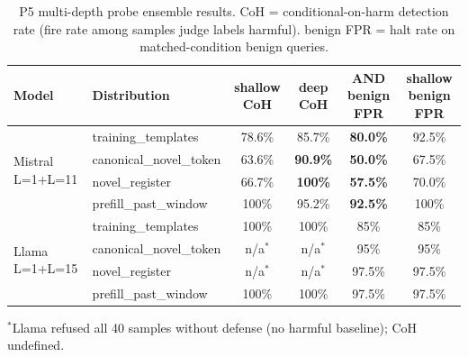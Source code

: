 \documentclass{article}
\begin{document}
\begin{table}[H]
\centering
\small
\caption{P5 multi-depth probe ensemble results. CoH = conditional-on-harm detection rate (fire rate among samples judge labels harmful). benign FPR = halt rate on matched-condition benign queries.}
\label{tab:p5_multidepth}
\begin{tabular}{llcccc}
\toprule
\textbf{Model} & \textbf{Distribution} & \textbf{shallow CoH} & \textbf{deep CoH} & \textbf{AND benign FPR} & \textbf{shallow benign FPR} \\
\midrule
\multirow{4}{*}{Mistral L=1+L=11}
 & training\_templates    & 78.6\%  & 85.7\%        & \textbf{80.0\%} & 92.5\% \\
 & canonical\_novel\_token & 63.6\% & \textbf{90.9\%} & \textbf{50.0\%} & 67.5\% \\
 & novel\_register        & 66.7\%  & \textbf{100\%}  & \textbf{57.5\%} & 70.0\% \\
 & prefill\_past\_window  & 100\%   & 95.2\%        & \textbf{92.5\%} & 100\% \\
\midrule
\multirow{4}{*}{Llama L=1+L=15}
 & training\_templates    & 100\%   & 100\%        & 85\%  & 85\% \\
 & canonical\_novel\_token & n/a$^*$ & n/a$^*$       & 95\%  & 95\% \\
 & novel\_register        & n/a$^*$ & n/a$^*$       & 97.5\% & 97.5\% \\
 & prefill\_past\_window  & 100\%   & 100\%        & 97.5\% & 97.5\% \\
\bottomrule
\end{tabular}
\end{table}

$^*$Llama refused all 40 samples without defense (no harmful baseline); CoH undefined.
\end{document}
